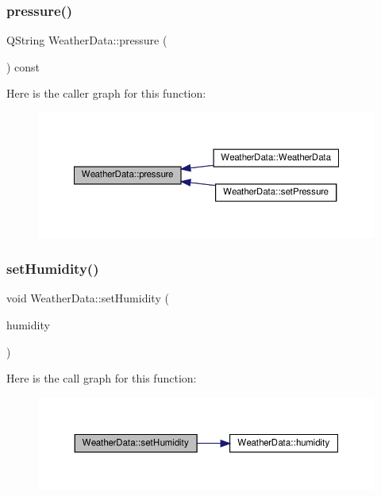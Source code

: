 \subsubsection{\texorpdfstring{pressure()}{pressure()}}
{\footnotesize\ttfamily Q\+String Weather\+Data\+::pressure (\begin{DoxyParamCaption}{ }\end{DoxyParamCaption}) const}

Here is the caller graph for this function\+:\nopagebreak
\begin{figure}[H]
\begin{center}
\leavevmode
\includegraphics[width=350pt]{class_weather_data_af726e713890bd6d310fe4a718dd69c77_icgraph}
\end{center}
\end{figure}
\mbox{\label{class_weather_data_aad895695b5f0651c58657973f2140509}} 
\subsubsection{\texorpdfstring{set\+Humidity()}{setHumidity()}}
{\footnotesize\ttfamily void Weather\+Data\+::set\+Humidity (\begin{DoxyParamCaption}\item[{const Q\+String \&}]{humidity }\end{DoxyParamCaption})}

Here is the call graph for this function\+:\nopagebreak
\begin{figure}[H]
\begin{center}
\leavevmode
\includegraphics[width=350pt]{class_weather_data_aad895695b5f0651c58657973f2140509_cgraph}
\end{center}
\end{figure}
\mbox{\label{class_weather_data_ad5b453016656864e2bc3a09fc75919a0}} 
